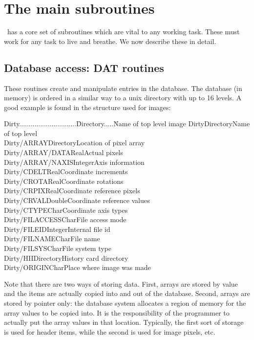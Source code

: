 \newpage
\section{The main subroutines}

\sde\ has a core set of subroutines which are vital to any working task.
These must work for any task to live and breathe. We now describe these
in detail.
\subsection{Database access: DAT routines}
These routines create and manipulate entries in the database. 
The database (in memory) is ordered in a similar way to a 
unix directory with up to
16 levels. A good example is found in the structure used for images:
\begin{tabbing}
Dirty..............................\=Directory.....\=Name of top level image\kill
Dirty\>Directory\>Name of top level\\
Dirty/ARRAY\>Directory\>Location of pixel array\\
Dirty/ARRAY/DATA\>Real\>Actual pixels\\
Dirty/ARRAY/NAXIS\>Integer\>Axis information\\
Dirty/CDELT\>Real\>Coordinate increments\\
Dirty/CROTA\>Real\>Coordinate rotations\\
Dirty/CRPIX\>Real\>Coordinate reference pixels\\
Dirty/CRVAL\>Double\>Coordinate reference values\\
Dirty/CTYPE\>Char\>Coordinate axis types\\
Dirty/FILACCESS\>Char\>File access mode\\
Dirty/FILEID\>Integer\>Internal file id\\
Dirty/FILNAME\>Char\>File name\\
Dirty/FILSYS\>Char\>File system type\\
Dirty/HII\>Directory\>History card directory\\
Dirty/ORIGIN\>Char\>Place where image was made
\end{tabbing}

Note that there are two ways of storing data. First, arrays are
stored by value and the items are actually copied into and out of the
database. Second, arrays are stored by pointer only: the database
system allocates a region of memory for the array values to be copied
into. It is the responsibility of the programmer to actually put the
array values in that location. Typically, the first sort of storage is
used for header items, while the second is used for image pixels, etc.

